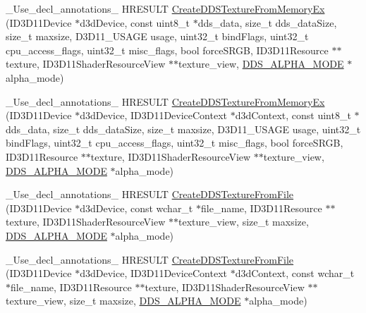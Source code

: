 \begin{DoxyCompactItemize}
\+\_\+\+Use\+\_\+decl\+\_\+annotations\+\_\+ H\+R\+E\+S\+U\+LT \hyperlink{namespacemage_aefe8be9cf3ce2f8fb9615346ac53868f}{Create\+D\+D\+S\+Texture\+From\+Memory\+Ex} (I\+D3\+D11\+Device $\ast$d3d\+Device, const uint8\+\_\+t $\ast$dds\+\_\+data, size\+\_\+t dds\+\_\+data\+Size, size\+\_\+t maxsize, D3\+D11\+\_\+\+U\+S\+A\+GE usage, uint32\+\_\+t bind\+Flags, uint32\+\_\+t cpu\+\_\+access\+\_\+flags, uint32\+\_\+t misc\+\_\+flags, bool force\+S\+R\+GB, I\+D3\+D11\+Resource $\ast$$\ast$texture, I\+D3\+D11\+Shader\+Resource\+View $\ast$$\ast$texture\+\_\+view, \hyperlink{namespacemage_a0c586a2bad862f4858900ca121ca80c2}{D\+D\+S\+\_\+\+A\+L\+P\+H\+A\+\_\+\+M\+O\+DE} $\ast$alpha\+\_\+mode)
\item 
\+\_\+\+Use\+\_\+decl\+\_\+annotations\+\_\+ H\+R\+E\+S\+U\+LT \hyperlink{namespacemage_a9adc89795f8da4f15483e1a4ebe7533d}{Create\+D\+D\+S\+Texture\+From\+Memory\+Ex} (I\+D3\+D11\+Device $\ast$d3d\+Device, I\+D3\+D11\+Device\+Context $\ast$d3d\+Context, const uint8\+\_\+t $\ast$dds\+\_\+data, size\+\_\+t dds\+\_\+data\+Size, size\+\_\+t maxsize, D3\+D11\+\_\+\+U\+S\+A\+GE usage, uint32\+\_\+t bind\+Flags, uint32\+\_\+t cpu\+\_\+access\+\_\+flags, uint32\+\_\+t misc\+\_\+flags, bool force\+S\+R\+GB, I\+D3\+D11\+Resource $\ast$$\ast$texture, I\+D3\+D11\+Shader\+Resource\+View $\ast$$\ast$texture\+\_\+view, \hyperlink{namespacemage_a0c586a2bad862f4858900ca121ca80c2}{D\+D\+S\+\_\+\+A\+L\+P\+H\+A\+\_\+\+M\+O\+DE} $\ast$alpha\+\_\+mode)
\item 
\+\_\+\+Use\+\_\+decl\+\_\+annotations\+\_\+ H\+R\+E\+S\+U\+LT \hyperlink{namespacemage_abb3d998e8e64bab729050e5d6b9e848c}{Create\+D\+D\+S\+Texture\+From\+File} (I\+D3\+D11\+Device $\ast$d3d\+Device, const wchar\+\_\+t $\ast$file\+\_\+name, I\+D3\+D11\+Resource $\ast$$\ast$texture, I\+D3\+D11\+Shader\+Resource\+View $\ast$$\ast$texture\+\_\+view, size\+\_\+t maxsize, \hyperlink{namespacemage_a0c586a2bad862f4858900ca121ca80c2}{D\+D\+S\+\_\+\+A\+L\+P\+H\+A\+\_\+\+M\+O\+DE} $\ast$alpha\+\_\+mode)
\item 
\+\_\+\+Use\+\_\+decl\+\_\+annotations\+\_\+ H\+R\+E\+S\+U\+LT \hyperlink{namespacemage_ae4d1a462c004d260ef861c9ccdcba9e3}{Create\+D\+D\+S\+Texture\+From\+File} (I\+D3\+D11\+Device $\ast$d3d\+Device, I\+D3\+D11\+Device\+Context $\ast$d3d\+Context, const wchar\+\_\+t $\ast$file\+\_\+name, I\+D3\+D11\+Resource $\ast$$\ast$texture, I\+D3\+D11\+Shader\+Resource\+View $\ast$$\ast$texture\+\_\+view, size\+\_\+t maxsize, \hyperlink{namespacemage_a0c586a2bad862f4858900ca121ca80c2}{D\+D\+S\+\_\+\+A\+L\+P\+H\+A\+\_\+\+M\+O\+DE} $\ast$alpha\+\_\+mode)

\end{DoxyCompactItemize}
